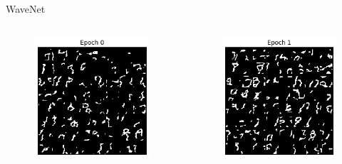 \begin{frame}[allowframebreaks]{WaveNet}
\begin{columns}
\begin{column}{0.18\linewidth}
\begin{figure}
                \includegraphics[width=1\linewidth]{images/autoregressive/mnist/epoch-0.png}
            \end{figure}
        \end{column}
        \begin{column}{0.18\linewidth}
            \begin{figure}
                \centering
                \includegraphics[width=1\linewidth]{images/autoregressive/mnist/epoch-1.png}

\end{figure}
\end{column}
\end{columns}
\end{frame}
